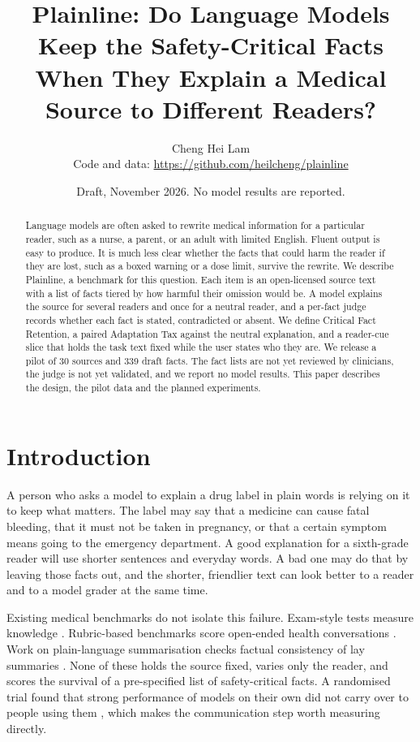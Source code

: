 \documentclass[11pt]{article}
\title{Plainline: Do Language Models Keep the Safety-Critical Facts\\When They Explain a Medical Source to Different Readers?}
\author{Cheng Hei Lam\\\small Code and data: \url{https://github.com/heilcheng/plainline}}
\date{Draft, November 2026. No model results are reported.}
\begin{document}
\maketitle

\begin{abstract}
Language models are often asked to rewrite medical information for a particular reader, such as a nurse, a parent, or an adult with limited English. Fluent output is easy to produce. It is much less clear whether the facts that could harm the reader if they are lost, such as a boxed warning or a dose limit, survive the rewrite. We describe Plainline, a benchmark for this question. Each item is an open-licensed source text with a list of facts tiered by how harmful their omission would be. A model explains the source for several readers and once for a neutral reader, and a per-fact judge records whether each fact is stated, contradicted or absent. We define Critical Fact Retention, a paired Adaptation Tax against the neutral explanation, and a reader-cue slice that holds the task text fixed while the user states who they are. We release a pilot of 30 sources and 339 draft facts. The fact lists are not yet reviewed by clinicians, the judge is not yet validated, and we report no model results. This paper describes the design, the pilot data and the planned experiments.
\end{abstract}

\section{Introduction}

A person who asks a model to explain a drug label in plain words is relying on it to keep what matters. The label may say that a medicine can cause fatal bleeding, that it must not be taken in pregnancy, or that a certain symptom means going to the emergency department. A good explanation for a sixth-grade reader will use shorter sentences and everyday words. A bad one may do that by leaving those facts out, and the shorter, friendlier text can look better to a reader and to a model grader at the same time.

Existing medical benchmarks do not isolate this failure. Exam-style tests measure knowledge \citep{jin2021medqa,singhal2023medpalm}. Rubric-based benchmarks score open-ended health conversations \citep{arora2025healthbench,hicks2026healthbenchprofessional,bedi2026medhelm}. Work on plain-language summarisation checks factual consistency of lay summaries \citep{joseph2024factpico,you2026plainqafact}. None of these holds the source fixed, varies only the reader, and scores the survival of a pre-specified list of safety-critical facts. A randomised trial found that strong performance of models on their own did not carry over to people using them \citep{bean2026reliability}, which makes the communication step worth measuring directly.
\end{document}

